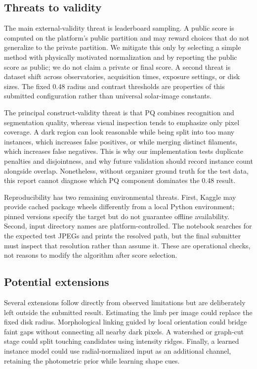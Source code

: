 \documentclass[sigconf]{acmart}
\begin{document}
\subsection{Threats to validity}
The main external-validity threat is leaderboard sampling. A public score is
computed on the platform's public partition and may reward choices that do not
generalize to the private partition. We mitigate this only by selecting a simple
method with physically motivated normalization and by reporting the public score
as public; we do not claim a private or final score. A second threat is dataset
shift across observatories, acquisition times, exposure settings, or disk sizes.
The fixed 0.48 radius and contrast thresholds are properties of this submitted
configuration rather than universal solar-image constants.

The principal construct-validity threat is that PQ combines recognition and
segmentation quality, whereas visual inspection tends to emphasize only pixel
coverage. A dark region can look reasonable while being split into too many
instances, which increases false positives, or while merging distinct filaments,
which increases false negatives. This is why our implementation tests duplicate
penalties and disjointness, and why future validation should record instance
count alongside overlap. Nonetheless, without organizer ground truth for the
test data, this report cannot diagnose which PQ component dominates the 0.48
result.

Reproducibility has two remaining environmental threats. First, Kaggle may
provide cached package wheels differently from a local Python environment;
pinned versions specify the target but do not guarantee offline availability.
Second, input directory names are platform-controlled. The notebook searches
for the expected test JPEGs and prints the resolved path, but the final submitter
must inspect that resolution rather than assume it. These are operational checks,
not reasons to modify the algorithm after score selection.

\subsection{Potential extensions}
Several extensions follow directly from observed limitations but are deliberately
left outside the submitted result. Estimating the limb per image could replace
the fixed disk radius. Morphological linking guided by local orientation could
bridge faint gaps without connecting all nearby dark pixels. A watershed or
graph-cut stage could split touching candidates using intensity ridges. Finally,
a learned instance model could use radial-normalized input as an additional
channel, retaining the photometric prior while learning shape cues.
\end{document}
